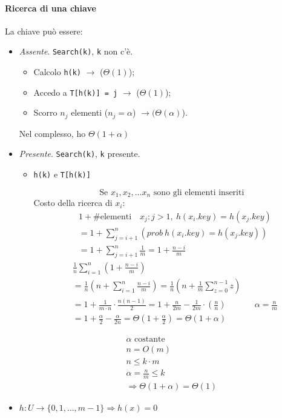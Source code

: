 \paragraph{Ricerca di una chiave} La chiave può essere:
\begin{itemize}
	\item \emph{Assente}. \texttt{Search(k)}, \texttt{k} non c'è.
	\begin{itemize}
		\item Calcolo \texttt{h(k)} $\rightarrow$ ($\Theta(1)$);
		\item Accedo a \texttt{T[h(k)] = j} $\rightarrow$ ($\Theta(1)$);
		\item Scorro $n_j$ elementi ($n_j = \alpha$) $\rightarrow (\Theta(\alpha)$).  
	\end{itemize}
	Nel complesso, ho $\Theta(1+\alpha)$

	\item \emph{Presente}. \texttt{Search(k)}, \texttt{k} presente.
	\begin{itemize}
		\item \texttt{h(k)} e \texttt{T[h(k)]}\par
			$$\text{Se } x_1, x_2,\dots x_n \text{ sono gli elementi inseriti}$$
		Costo della ricerca di $x_i$:
		\begin{align*}
			& 1 + \text{\# elementi} \quad x_j : j > 1, \ h(x_i.key) = h(x_j.key) \\
			& = 1 + \displaystyle\sum_{j=i+1}^n \left(prob \ h(x_i.key) = h(x_j.key)\right) \\
			& = 1 + \displaystyle\sum_{j=i+1}^n \frac{1}{m} = 1 + \frac{n-i}{m}
		\end{align*}
		\begin{align*}
			& \frac{1}{n} \displaystyle\sum_{i=1}^n \left( 1 + \frac{n-i}{m} \right) \\
			& = \frac{1}{n} \left( n + \displaystyle\sum_{i=1}^n \frac{n-i}{m} \right) 
				= \frac{1}{n} \left( n + \frac{1}{m} \displaystyle\sum_{z=0}^{n-1} z \right) \\
			& = 1 + \frac{1}{m \cdot n} \cdot \frac{n(n-1)}{2} = 1 + \frac{n}{2m} - \frac{1}{2m} \cdot \left(\frac{n}{n} \right) && \alpha = \frac{n}{m} \\
			& = 1 + \frac{\alpha}{2} - \frac{\alpha}{2n} = \Theta(1+ \frac{\alpha}{2}) = \Theta(1+ \alpha)
		\end{align*}

		\begin{gather*}
			\alpha \text{ costante} \\
			n = O(m) \\
			n \leq k \cdot m \\
			\alpha = \frac{n}{m} \leq k \\
			\Rightarrow \Theta(1 + \alpha) = \Theta(1)
		\end{gather*}
	\end{itemize}
	\item $h \colon U \to \{ 0,1,\dots,m-1 \} \Rightarrow h(x) = 0$
\end{itemize}

